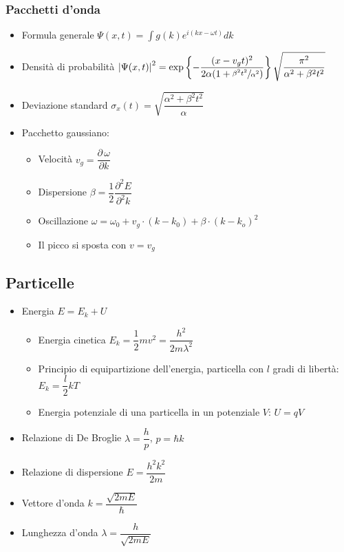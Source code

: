 \documentclass{article}
\begin{document}
\subsubsection{Pacchetti d'onda}
\begin{itemize}
  \item Formula generale \( \Psi(x, t) = \int{g(k) e^{i (kx- \omega t)} dk}  \)
  \item Densità di probabilità \( \left| \Psi(x, t) \right| ^ 2 = \exp\left\{-\dfrac{(x-v_g t) ^ 2}{2 \alpha (1 + \sfrac{\beta^2 t^2}{\alpha^2})}\right\} \sqrt{\dfrac{\pi^2}{\alpha^2 + \beta^2 t^2}} \)
  \item Deviazione standard \( \sigma_x (t) = \sqrt{ \dfrac{\alpha^2 + \beta^2 t^2}{\alpha} } \)
  \item Pacchetto gaussiano:
        \begin{itemize}
          \item Velocità \( v_g = \dfrac{\partial \, \omega}{\partial k} \)
          \item Dispersione \(\beta = \dfrac{1}{2} \dfrac{\partial ^ 2 E}{\partial ^ 2 k} \)
          \item Oscillazione \( \omega = \omega_0 + v_g \cdot (k - k_0) + \beta \cdot (k - k_o) ^ 2 \)
          \item Il picco si sposta con \( v = v_g \)
        \end{itemize}
\end{itemize}

\subsection{Particelle}
\begin{itemize}
  \item Energia \( E = E_k + U \)
        \begin{itemize}
          \item Energia cinetica \( E_k = \dfrac{1}{2} m v ^ 2 = \dfrac{h ^ 2}{2 m \lambda ^ 2 }\)
          \item Principio di equipartizione dell'energia, particella con \( l \) gradi di libertà: \( E_k = \dfrac{l}{2} k T \)
          \item Energia potenziale di una particella in un potenziale \( V \): \( U = qV \)
        \end{itemize}
  \item Relazione di De Broglie \( \lambda = \dfrac{h}{p} \), \( p = \hbar k \)
  \item Relazione di dispersione \( E = \dfrac{h ^ 2 k ^ 2}{2 m} \)
  \item Vettore d'onda \( \displaystyle k = \dfrac{\sqrt{2mE}}{\hbar} \)
  \item Lunghezza d'onda \( \displaystyle \lambda = \dfrac{h}{\sqrt{2mE}} \)
\end{itemize}
\end{document}
